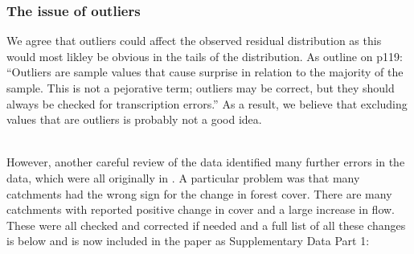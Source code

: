 \documentclass[]{elsarticle} %
\begin{document}
\hypertarget{the-issue-of-outliers}{%
\subsubsection{The issue of outliers}\label{the-issue-of-outliers}}

We agree that outliers could affect the observed residual distribution as this would most likley be obvious in the tails of the distribution. As \citet{venables2013modern} outline on p119:
``Outliers are sample values that cause surprise in relation to the majority of the sample. This is not a pejorative term; outliers may be correct, but they should always be checked for transcription errors.'' As a result, we believe that excluding values that are outliers is probably not a good idea.\\
\strut \\
However, another careful review of the data identified many further errors in the data, which were all originally in \citet{zhang2017}. A particular problem was that many catchments had the wrong sign for the change in forest cover. There are many catchments with reported positive change in cover and a large increase in flow. These were all checked and corrected if needed and a full list of all these changes is below and is now included in the paper as Supplementary Data Part 1:
\end{document}
